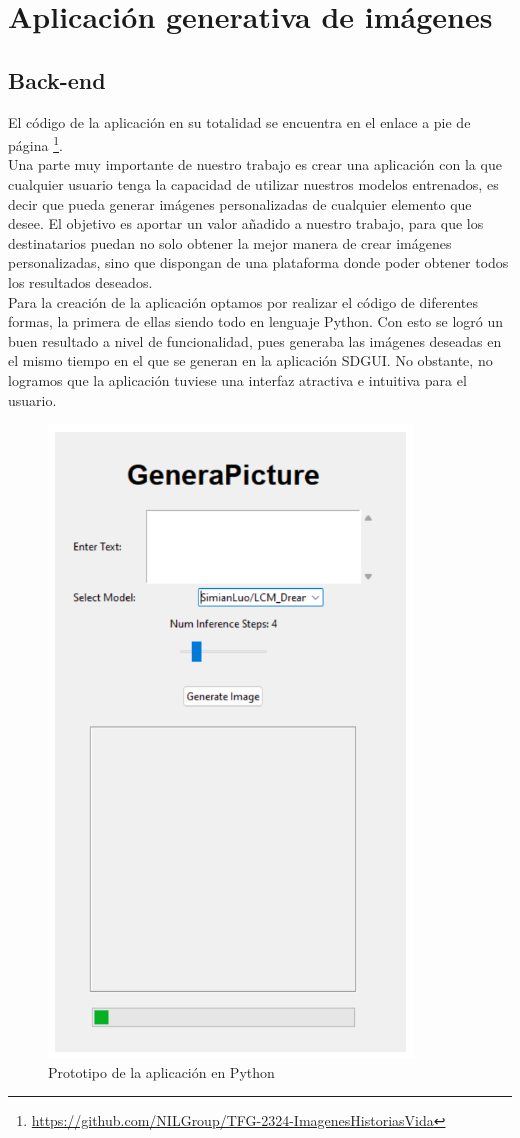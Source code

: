 \chapter{Aplicación generativa de imágenes}
\label{cap:aplicacion}
\section{Back-end}

El código de la aplicación en su totalidad se encuentra en el enlace a pie de página \footnote{\url{https://github.com/NILGroup/TFG-2324-ImagenesHistoriasVida}}.\\

Una parte muy importante de nuestro trabajo es crear una aplicación con la que cualquier usuario tenga la capacidad de utilizar nuestros modelos entrenados, es decir que pueda generar imágenes personalizadas de cualquier elemento que desee. El objetivo es aportar un valor añadido a nuestro trabajo, para que los destinatarios puedan no solo obtener la mejor manera de crear imágenes personalizadas, sino que dispongan de una plataforma donde poder obtener todos los resultados deseados.\\

Para la creación de la aplicación optamos por realizar el código de diferentes formas, la primera de ellas siendo todo en lenguaje Python. Con esto se logró un buen resultado a nivel de funcionalidad, pues generaba las imágenes deseadas en el mismo tiempo en el que se generan en la aplicación SDGUI. No obstante, no logramos que la aplicación tuviese una interfaz atractiva e intuitiva para el usuario.\\

\begin{figure}[!htb]
	\centering
	\includegraphics[width = 0.3
	\textwidth]{Imagenes/Vectorial/app1.png}
	\caption{Prototipo de la aplicación en Python}
	\label{fig:app1}
\end{figure}

